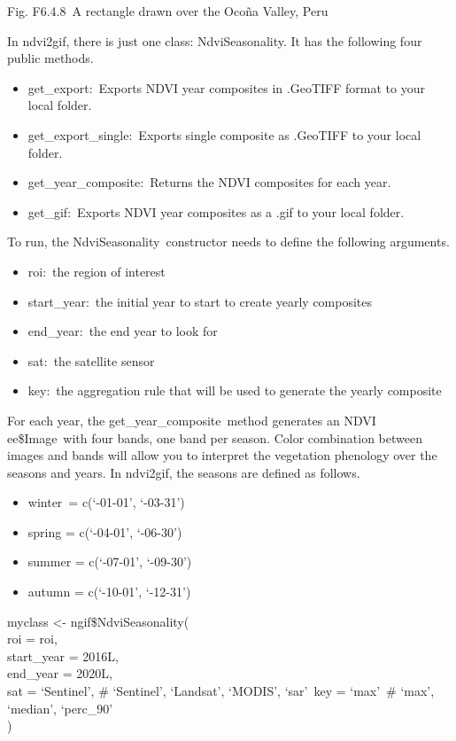 \documentclass[
  letterpaper,
  DIV=11,
  numbers=noendperiod]{scrreprt}
\providecommand{\tightlist}{%
  \setlength{\itemsep}{0pt}\setlength{\parskip}{0pt}}\usepackage{longtable,booktabs,array}
\begin{document}
Fig. F6.4.8~A rectangle drawn over the Ocoña Valley, Peru

In ndvi2gif, there is just one class: NdviSeasonality. It has the
following four public methods.~

\begin{itemize}
\tightlist
\item
  get\_export:~Exports NDVI year composites in .GeoTIFF format to your
  local folder.
\item
  get\_export\_single:~Exports single composite as .GeoTIFF to your
  local folder.
\item
  get\_year\_composite:~Returns the NDVI composites for each year.
\item
  get\_gif:~Exports NDVI year composites as a .gif to your local folder.
\end{itemize}

To run, the NdviSeasonality~constructor needs to define the following
arguments.

\begin{itemize}
\tightlist
\item
  roi:~the region of interest
\item
  start\_year:~the initial year to start to create yearly composites
\item
  end\_year:~the end year to look for
\item
  sat:~the satellite sensor
\item
  key:~the aggregation rule that will be used to generate the yearly
  composite
\end{itemize}

For each year, the get\_year\_composite~method generates an NDVI
ee\$Image~with four bands, one band per season. Color combination
between images and bands will allow you to interpret the vegetation
phenology over the seasons and years. In ndvi2gif, the seasons are
defined as follows.

\begin{itemize}
\tightlist
\item
  winter~= c(`-01-01', `-03-31')
\item
  spring = c(`-04-01', `-06-30')
\item
  summer = c(`-07-01', `-09-30')
\item
  autumn = c(`-10-01', `-12-31')
\end{itemize}

myclass \textless- ngif\$NdviSeasonality(\\
\hspace*{0.333em}roi = roi,\\
\hspace*{0.333em}start\_year = 2016L,\\
\hspace*{0.333em}end\_year = 2020L,\\
\hspace*{0.333em}sat = `Sentinel', \# `Sentinel', `Landsat', `MODIS',
`sar'~key = `max'~\# `max', `median', `perc\_90'\\
)
\end{document}
